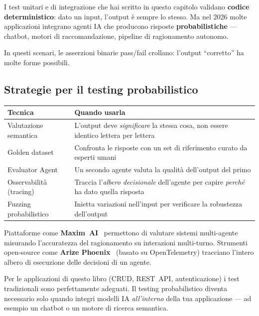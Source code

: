I test unitari e di integrazione che hai scritto in questo capitolo validano \textbf{codice deterministico}: dato un input, l'output è sempre lo stesso. Ma nel 2026 molte applicazioni integrano agenti IA che producono risposte \textbf{probabilistiche} --- chatbot, motori di raccomandazione, pipeline di ragionamento autonomo.

In questi scenari, le asserzioni binarie pass/fail crollano: l'output ``corretto'' ha molte forme possibili.

\subsection{Strategie per il testing probabilistico}

\begin{center}
\begin{tabularx}{\textwidth}{l X}
\toprule
\textbf{Tecnica} & \textbf{Quando usarla} \\
\midrule
Valutazione semantica & L'output deve \textit{significare} la stessa cosa, non essere identico lettera per lettera \\
Golden dataset & Confronta le risposte con un set di riferimento curato da esperti umani \\
Evaluator Agent & Un secondo agente valuta la qualità dell'output del primo \\
Osservabilità (tracing) & Traccia l'\textit{albero decisionale} dell'agente per capire \textit{perché} ha dato quella risposta \\
Fuzzing probabilistico & Inietta variazioni nell'input per verificare la robustezza dell'output \\
\bottomrule
\end{tabularx}
\end{center}

\begin{tipbox}
Piattaforme come \textbf{Maxim~AI}~\cite{maxim:eval-2026} permettono di valutare sistemi multi-agente misurando l'accuratezza del ragionamento su interazioni multi-turno. Strumenti open-source come \textbf{Arize Phoenix}~\cite{arize:phoenix} (basato su OpenTelemetry) tracciano l'intero albero di esecuzione delle decisioni di un agente.
\end{tipbox}

\begin{notebox}
Per le applicazioni di questo libro (CRUD, REST~API, autenticazione) i test tradizionali sono perfettamente adeguati. Il testing probabilistico diventa necessario solo quando integri modelli IA \textit{all'interno} della tua applicazione --- ad esempio un chatbot o un motore di ricerca semantica.
\end{notebox}

